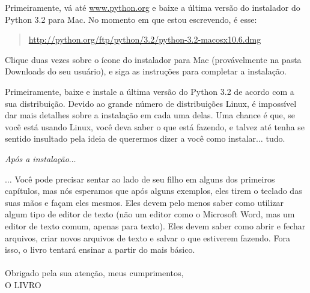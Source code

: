 \begin{MAC}

\noindent
Primeiramente, vá até \href{http://www.python.org}{www.python.org} e baixe a última versão do instalador do Python 3.2 para Mac. No momento em que estou escrevendo, é esse:
\begin{quote}
     \href{http://python.org/ftp/python/3.2/python-3.2-macosx10.6.dmg}{http://python.org/ftp/python/3.2/python-3.2-macosx10.6.dmg}
\end{quote}
Clique duas vezes sobre o ícone do instalador para Mac (provávelmente na pasta Downloads do seu usuário), e siga as instruções para completar a instalação.

\end{MAC}

\begin{LINUX}

\noindent
Primeiramente, baixe e instale a última versão do Python 3.2 de acordo com a sua distribuição. Devido ao grande número de distribuições Linux, é impossível dar mais detalhes sobre a instalação em cada uma delas. Uma chance é que, se você está usando Linux, você deva saber o que está fazendo, e talvez até tenha se sentido insultado pela ideia de querermos dizer a você como instalar$\ldots$ tudo.

\end{LINUX}

\noindent
\emph{\color{BrickRed}Após a instalação$\ldots$}

\noindent
$\ldots$
Você pode precisar sentar ao lado de seu filho em alguns dos primeiros capítulos, mas nós esperamos que após alguns exemplos, eles tirem o teclado das suas mãos e façam eles mesmos. Eles devem pelo menos saber como utilizar algum tipo de editor de texto (não um editor como o Microsoft Word, mas um editor de texto comum, apenas para texto). Eles devem saber como abrir e fechar arquivos, criar novos arquivos de texto e salvar o que estiverem fazendo. Fora isso, o livro tentará ensinar a partir do mais básico.
\\
\noindent\\
Obrigado pela sua atenção, meus cumprimentos,
\noindent\\
O LIVRO
